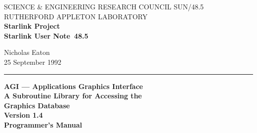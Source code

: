 \pagestyle{myheadings}

\newcommand{\stardoccategory}  {Starlink User Note}
\newcommand{\stardocinitials}  {SUN}
\newcommand{\stardocnumber}    {48.5}
\newcommand{\stardocauthors}   {Nicholas Eaton}
\newcommand{\stardocdate}      {25 September 1992}
\newcommand{\stardoctitle}     {AGI --- Applications Graphics Interface\\[2.5ex]
                                A Subroutine Library for Accessing the\\
                                Graphics Database}
\newcommand{\stardocversion}   {Version 1.4}
\newcommand{\stardocmanual}    {Programmer's Manual}

\newcommand{\stardocname}{\stardocinitials /\stardocnumber}
\renewcommand{\_}{{\tt\char'137}}     %
\markright{\stardocname}
\setlength{\textwidth}{160mm}
\setlength{\textheight}{230mm}
\setlength{\topmargin}{-2mm}
\setlength{\oddsidemargin}{0mm}
\setlength{\evensidemargin}{0mm}
\setlength{\parindent}{0mm}
\setlength{\parskip}{\medskipamount}
\setlength{\unitlength}{1mm}



\thispagestyle{empty}
SCIENCE \& ENGINEERING RESEARCH COUNCIL \hfill \stardocname\\
RUTHERFORD APPLETON LABORATORY\\
{\large\bf Starlink Project\\}
{\large\bf \stardoccategory\ \stardocnumber}
\begin{flushright}
\stardocauthors\\
\stardocdate
\end{flushright}
\vspace{-4mm}
\rule{\textwidth}{0.5mm}
\vspace{5mm}
\begin{center}
{\LARGE\bf \stardoctitle\\[2.5ex]}
{\Large\bf \stardocversion\\[4.0ex]}
{\LARGE\bf \stardocmanual}
\end{center}
\vspace{10mm}

